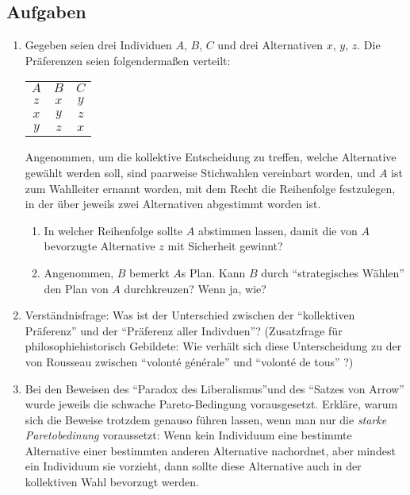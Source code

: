 \subsection{Aufgaben}

\begin{enumerate}
  \item \label{AufgPL0} Gegeben seien drei Individuen $A$, $B$, $C$ und drei
  Alternativen $x$, $y$, $z$. Die Präferenzen seien folgendermaßen verteilt:
  \begin{center}
  \begin{tabular}{ccc}
  $A$ & $B$ & $C$ \\
  \cline{1-3}
  $z$ & $x$ & $y$ \\
  $x$ & $y$ & $z$ \\
  $y$ & $z$ & $x$ \\
  \end{tabular}
  \end{center}
  Angenommen, um die kollektive Entscheidung zu treffen, welche Alternative
  gewählt werden soll, sind paarweise Stichwahlen vereinbart worden, und $A$
  ist zum Wahlleiter ernannt worden, mit dem Recht die Reihenfolge festzulegen, 
  in der über jeweils zwei Alternativen abgestimmt worden ist. 
  
  \begin{enumerate}
    \item In welcher Reihenfolge sollte $A$ abstimmen lassen, damit die von $A$
    bevorzugte Alternative $z$ mit Sicherheit gewinnt?
    \item Angenommen, $B$ bemerkt $A$s Plan. Kann $B$ durch "`strategisches
    Wählen"' den Plan von $A$ durchkreuzen? Wenn ja, wie?
  \end{enumerate}
  
  \item Verständnisfrage: Was ist der Unterschied zwischen der "`kollektiven
  Präferenz"' und der "`Präferenz aller Indivduen"'? (Zusatzfrage für
  philosophiehistorisch Gebildete: Wie verhält sich diese
  Unterscheidung zu der von Rousseau zwischen "`volonté
  générale"' und "`volonté de tous"' ?)
  
  \item \label{AufgPareto} Bei den Beweisen des "`Paradox des
  Liberalismus"'und des "`Satzes von Arrow"' wurde jeweils die schwache
  Pareto-Bedingung vorausgesetzt. Erkläre, warum sich die Beweise trotzdem
  genauso führen lassen, wenn man nur die {\em starke Paretobedinung}
  voraussetzt: Wenn kein Individuum eine bestimmte Alternative einer bestimmten
  anderen Alternative nachordnet, aber mindest ein Individuum sie vorzieht,
  dann sollte diese Alternative auch in der kollektiven Wahl bevorzugt werden.
  

\end{enumerate}
